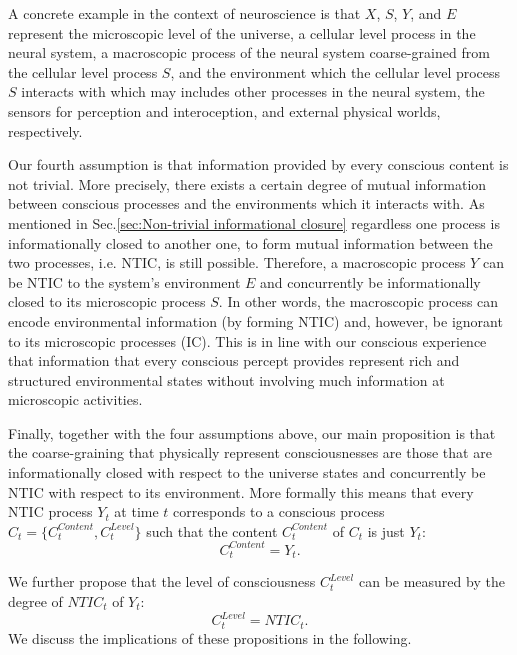 \documentclass[utf8]{article}
\begin{document}
        A concrete example in the context of neuroscience is that $X$, $S$, $Y$, and $E$ represent the microscopic level of the universe, a cellular level process in the neural system, a macroscopic process of the neural system coarse-grained from the cellular level process $S$, and the environment which the cellular level process $S$ interacts with which may includes other processes in the neural system, the sensors for perception and interoception, and external physical worlds, respectively.	   	
        
        Our fourth assumption is that information provided by every conscious content is not trivial. More precisely, there exists a certain degree of mutual information between conscious processes and the environments which it interacts with. As mentioned in Sec.\ref{sec:Non-trivial informational closure} regardless one process is informationally closed to another one, to form mutual information between the two processes, i.e. NTIC, is still possible. Therefore, a macroscopic process $Y$ can be NTIC to the system's environment $E$ and concurrently be informationally closed to its microscopic process $S$. In other words, the macroscopic process can encode environmental information (by forming NTIC) and, however, be ignorant to its microscopic processes (IC). This is in line with our conscious experience that information that every conscious percept provides represent rich and structured environmental states without involving much information at microscopic activities.
        
        Finally, together with the four assumptions above, our main proposition is that the coarse-graining that physically represent consciousnesses are those that are informationally closed with respect to the universe states and concurrently be NTIC with respect to its environment. More formally this means that every NTIC process $Y_t$ at time $t$ corresponds to a conscious process $C_t=\{C_t^{Content},C_t^{Level}\}$ such that the content $C_{t}^{Content}$ of $C_t$ is just $Y_t$:
		\begin{equation}\label{eq:cContent}
			C_{t}^{Content} = Y_{t}.
		\end{equation}
		
		
		\noindent
        We further propose that the level of consciousness $C_{t}^{Level}$ can be measured by the degree of $NTIC_{t}$ of $Y_t$:
		\begin{equation}\label{eq:cLevel}
			C_{t}^{Level} = NTIC_{t}.
		\end{equation}
		We discuss the implications of these propositions in the following. 	
		
\end{document}
